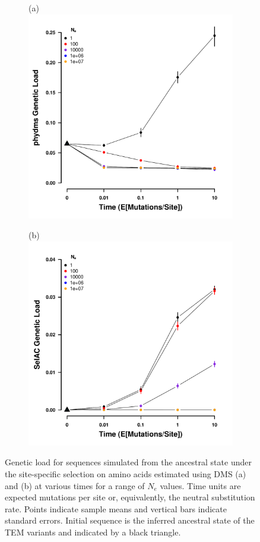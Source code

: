 \documentclass[fleqn,letterpaper]{article}
\begin{document}
\begin{figure}
    \centering
    \begin{subfigure}
        \centering
        (a)\includegraphics[width=.45\textwidth]{img/simulated_gl_time_DMS_ancest.pdf}
    \end{subfigure}
    \begin{subfigure}
        \centering
        (b)\includegraphics[width=.45\textwidth]{img/simulated_gl_time_SELAC_ancest.pdf}
    \end{subfigure}
    \caption{Genetic load for sequences simulated from the ancestral state under the site-specific selection on amino acids estimated using DMS (a) and \selac (b) at various times for a range of $N_e$ values.
    Time units are expected mutations per site or, equivalently, the neutral substitution rate.
    Points indicate sample means and vertical bars indicate standard errors. Initial sequence is the inferred ancestral state of the TEM variants and indicated by a black triangle.}
    \label{fig:gl_sim}
\end{figure}

\clearpage
\end{document}
